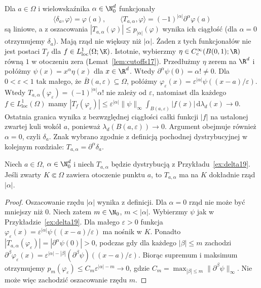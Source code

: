 \begin{przyklad}
\label{ex:delta19}
Dla $a\in\Omega$ i wielowskaźnika $\alpha\in\N_0^d$
funkcjonały
\[\langle\delta_a,\varphi\rangle=\varphi(a),\qquad
\langle T_{a,\alpha},\varphi\rangle
=(-1)^{|\alpha|}\partial^\alpha\varphi(a)\]
są liniowe, a z oszacowania
$|T_{a,\alpha}(\varphi)|\le p_{|\alpha|}(\varphi)$
wynika ich ciągłość (dla $\alpha=0$ otrzymujemy $\delta_a$).
Mają rząd nie większy niż $|\alpha|$.
Żaden z tych funkcjonałów nie jest postaci $T_f$
dla $f\in L^1_{\mathrm{loc}}(\Omega;\K)$.
Istotnie, wybierzmy $\eta\in C_c^\infty(B(0,1);\R)$
równą $1$ w otoczeniu zera (Lemat~\ref{lem:cutoffs17}).
Przedłużmy $\eta$ zerem na $\R^d$ i połóżmy
$\psi(x)=x^\alpha\eta(x)$ dla $x\in\R^d$.
Wtedy $\partial^\alpha\psi(0)=\alpha!\ne0$.
Dla $0<\varepsilon<1$ tak małego, że
$\overline B(a,\varepsilon)\subseteq\Omega$, połóżmy
$\varphi_\varepsilon(x)=\varepsilon^{|\alpha|}
\psi((x-a)/\varepsilon)$. Wtedy
$T_{a,\alpha}(\varphi_\varepsilon)=(-1)^{|\alpha|}\alpha!$
nie zależy od $\varepsilon$, natomiast dla każdego
$f\in L^1_{\mathrm{loc}}(\Omega)$ mamy
$|T_f(\varphi_\varepsilon)|\le
\varepsilon^{|\alpha|}\|\psi\|_\infty
\int_{B(a,\varepsilon)}|f(x)|\,\mathrm d\lambda_d(x)
\to0$.
Ostatnia granica wynika z bezwzględnej ciągłości całki
funkcji $|f|$ na ustalonej zwartej kuli wokół $a$,
ponieważ $\lambda_d(B(a,\varepsilon))\to0$.
Argument obejmuje również $\alpha=0$, czyli $\delta_a$.
Znak wybrano zgodnie z definicją
pochodnej dystrybucyjnej w kolejnym rozdziale:
$T_{a,\alpha}=\partial^\alpha\delta_a$.
\end{przyklad}

\begin{stwierdzenie}
\label{prop:delta-order19}
Niech $a\in\Omega$, $\alpha\in\N_0^d$ i niech
$T_{a,\alpha}$ będzie dystrybucją z Przykładu~\ref{ex:delta19}.
Jeśli zwarty $K\Subset\Omega$ zawiera otoczenie punktu $a$,
to $T_{a,\alpha}$ ma na $K$ dokładnie rząd $|\alpha|$.
\end{stwierdzenie}
\begin{proof}
Oszacowanie rzędu $|\alpha|$ wynika z definicji.
Dla $\alpha=0$ rząd nie może być mniejszy niż $0$.
Niech zatem $m\in\N_0$, $m<|\alpha|$.
Wybierzmy $\psi$ jak w Przykładzie~\ref{ex:delta19}.
Dla małego $\varepsilon>0$ funkcja
$\varphi_\varepsilon(x)=\varepsilon^{|\alpha|}
\psi((x-a)/\varepsilon)$ ma nośnik w $K$. Ponadto
$|T_{a,\alpha}(\varphi_\varepsilon)|
=|\partial^\alpha\psi(0)|>0$, podczas gdy
dla każdego $|\beta|\le m$ zachodzi
$\partial^\beta\varphi_\varepsilon(x)=
\varepsilon^{|\alpha|-|\beta|}(\partial^\beta\psi)((x-a)/\varepsilon)$.
Biorąc supremum i maksimum otrzymujemy
$p_m(\varphi_\varepsilon)\le C_m\varepsilon^{|\alpha|-m}
\to0$, gdzie $C_m=\max_{|\beta|\le m}\|\partial^\beta\psi\|_\infty$.
Nie może więc zachodzić oszacowanie rzędu $m$.
\end{proof}

